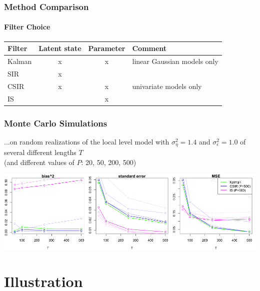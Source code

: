 \documentclass[11pt]{beamer}
\begin{document}
\begin{frame}
\end{frame}

\begin{frame}
\frametitle{Method Comparison}
\framesubtitle{Filter Choice}
\begin{table}
\centering
\begin{tabular}{lccl}
\hline
Filter  & Latent state & Parameter & Comment\\
\hline
Kalman    & x & x & linear Gaussian models only\\
SIR      & x & &\\
CSIR      & x & x & univariate models only\\
IS      & & x & \\
\hline
\end{tabular}
\end{table}
\end{frame}

\begin{frame}
\frametitle{Monte Carlo Simulations}
...on random realizations of the local level model with $\sigma_{\eta}^2=1.4$ and $\sigma_{\epsilon}^2=1.0$ of several different lengths $T$ \\(and different values of $P$: 20, 50, 200, 500)
\bigskip
\begin{center}
\includegraphics[scale=0.33]{ullm-mc-mle}
\end{center}
\end{frame}

\section{Illustration}
\end{document}
